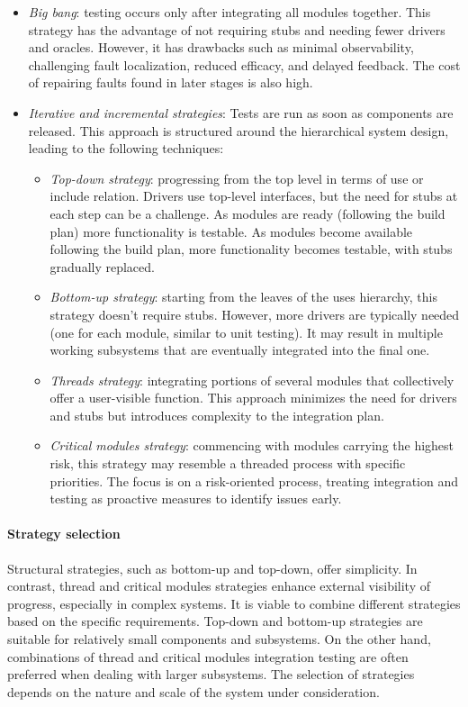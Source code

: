 \begin{itemize}
    \item \textit{Big bang}: testing occurs only after integrating all modules together. 
        This strategy has the advantage of not requiring stubs and needing fewer drivers and oracles. 
        However, it has drawbacks such as minimal observability, challenging fault localization, reduced efficacy, and delayed feedback. 
        The cost of repairing faults found in later stages is also high.
    \item \textit{Iterative and incremental strategies}: Tests are run as soon as components are released. 
        This approach is structured around the hierarchical system design, leading to the following techniques:
        \begin{itemize}
            \item \textit{Top-down strategy}: progressing from the top level in terms of use or include relation.
                Drivers use top-level interfaces, but the need for stubs at each step can be a challenge. 
                As modules are ready (following the build plan) more functionality is testable.
                As modules become available following the build plan, more functionality becomes testable, with stubs gradually replaced.
            \item \textit{Bottom-up strategy}: starting from the leaves of the uses hierarchy, this strategy doesn't require stubs.
                However, more drivers are typically needed (one for each module, similar to unit testing). 
                It may result in multiple working subsystems that are eventually integrated into the final one.
            \item \textit{Threads strategy}: integrating portions of several modules that collectively offer a user-visible function. 
                This approach minimizes the need for drivers and stubs but introduces complexity to the integration plan.
            \item \textit{Critical modules strategy}: commencing with modules carrying the highest risk, this strategy may resemble a threaded process with specific priorities. 
                The focus is on a risk-oriented process, treating integration and testing as proactive measures to identify issues early.
        \end{itemize}
\end{itemize}

\paragraph*{Strategy selection}
Structural strategies, such as bottom-up and top-down, offer simplicity. 
In contrast, thread and critical modules strategies enhance external visibility of progress, especially in complex systems. 
It is viable to combine different strategies based on the specific requirements.
Top-down and bottom-up strategies are suitable for relatively small components and subsystems.
On the other hand, combinations of thread and critical modules integration testing are often preferred when dealing with larger subsystems. 
The selection of strategies depends on the nature and scale of the system under consideration.

